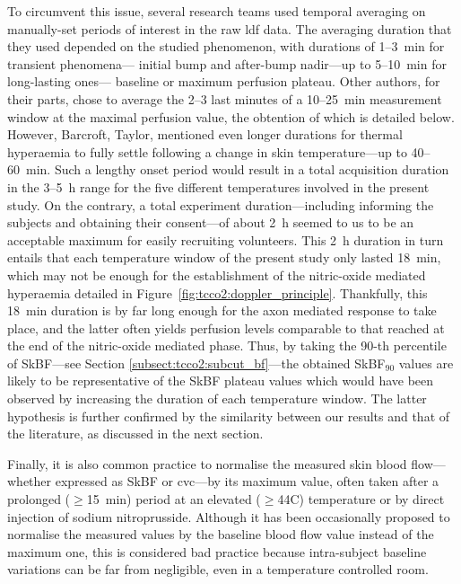 To circumvent this issue, several research teams used temporal averaging on manually-set periods of interest in the raw \gls{ldf} data. The averaging duration that they used depended on the studied phenomenon, with durations of 1--3~min for transient phenomena---\ie{} initial bump and after-bump nadir---up to 5--10~min for long-lasting ones---\ie{} baseline or maximum perfusion plateau\cite{minson2001, frantz2012}. Other authors, for their parts, chose to average the 2--3 last minutes of a 10--25~min measurement window at the maximal perfusion value, the obtention of which is detailed below\cite{kellogg2008, hodges2016}. However, Barcroft, Taylor, \etal{}\cite{barcroft1943, taylor1984} mentioned even longer durations for thermal hyperaemia to fully settle following a change in skin temperature---up to 40--60~min. Such a lengthy onset period would result in a total acquisition duration in the 3--5~h range for the five different temperatures involved in the present study. On the contrary, a total experiment duration---including informing the subjects and obtaining their consent---of about 2~h seemed to us to be an acceptable maximum for easily recruiting volunteers. This 2~h duration in turn entails that each temperature window of the present study only lasted 18~min, which may not be enough for the establishment of the nitric-oxide mediated hyperaemia detailed in Figure~\ref{fig:tcco2:doppler_principle}. Thankfully, this 18~min duration is by far long enough for the axon mediated response to take place, and the latter often yields perfusion levels comparable to that reached at the end of the nitric-oxide mediated phase\cite{kellogg2008, minson2010, frantz2012,}. Thus, by taking the 90-th percentile of SkBF---see Section \ref{subsect:tcco2:subcut_bf}---the obtained SkBF$_{90}$ values are likely to be representative of the SkBF plateau values which would have been observed by increasing the duration of each temperature window. The latter hypothesis is further confirmed by the similarity between our results and that of the literature, as discussed in the next section.

Finally, it is also common practice to normalise the measured skin blood flow---whether expressed as SkBF or \gls{cvc}---by its maximum value, often taken after a prolonged ($\geq$15~min) period at an elevated ($\geq$44{\degree}C) temperature\cite{taylor1984, vionnet2014, hodges2016} or by direct injection of sodium nitroprusside\cite{kellogg2008}. Although it has been occasionally proposed to normalise the measured values by the baseline blood flow value instead of the maximum one\cite{magerl1996, mayrovitz2001}, this is considered bad practice because intra-subject baseline variations can be far from negligible, even in a temperature controlled room\cite{bircher1994, cracowski2006}.

